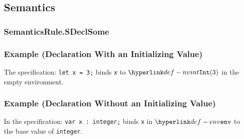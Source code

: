 \begin{mathpar}
\end{mathpar}

\subsection{Semantics}
\subsubsection{SemanticsRule.SDeclSome\label{sec:SemanticsRule.SDeclSome}}
\subsubsection{Example (Declaration With an Initializing Value)}
The specification:
\texttt{let x = 3;} binds \texttt{x} to $\nvint(3)$ in the empty environment.

\subsubsection{Example (Declaration Without an Initializing Value)}
In the specification:
\texttt{var x : integer;} binds \texttt{x} in $\env$ to the base value of \texttt{integer}.

